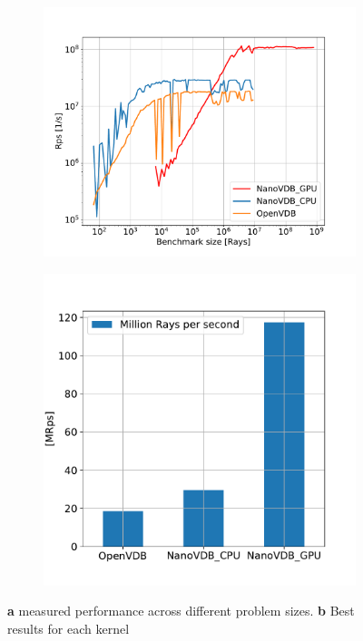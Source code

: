 \begin{figure}[h]
    \begin{subfigure}{0.5\textwidth}
    \includegraphics[width=1\linewidth]{res/results.pdf} 
    \caption{}
    
\end{subfigure}
    \begin{subfigure}{0.4\textwidth}
    \includegraphics[width=1\linewidth]{res/barplot.pdf}
    \caption{}
\end{subfigure}

\caption{\textbf{a} measured performance across different problem sizes. \textbf{b} Best results for each kernel}
\label{fig:results}
\end{figure}


\nocite{openvdb}
\nocite{nanovdb}
